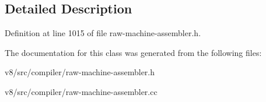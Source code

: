 \subsection{Detailed Description}


Definition at line 1015 of file raw-\/machine-\/assembler.\+h.



The documentation for this class was generated from the following files\+:\begin{DoxyCompactItemize}
\item 
v8/src/compiler/raw-\/machine-\/assembler.\+h\item 
v8/src/compiler/raw-\/machine-\/assembler.\+cc\end{DoxyCompactItemize}
